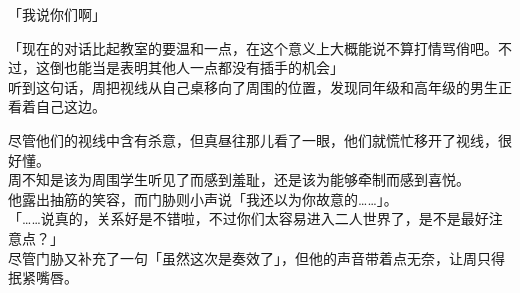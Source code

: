 「我说你们啊」

「现在的对话比起教室的要温和一点，在这个意义上大概能说不算打情骂俏吧。不过，这倒也能当是表明其他人一点都没有插手的机会」\\

听到这句话，周把视线从自己桌移向了周围的位置，发现同年级和高年级的男生正看着自己这边。

尽管他们的视线中含有杀意，但真昼往那儿看了一眼，他们就慌忙移开了视线，很好懂。\\

周不知是该为周围学生听见了而感到羞耻，还是该为能够牵制而感到喜悦。\\

他露出抽筋的笑容，而门胁则小声说「我还以为你故意的……」。\\

「……说真的，关系好是不错啦，不过你们太容易进入二人世界了，是不是最好注意点？」\\

尽管门胁又补充了一句「虽然这次是奏效了」，但他的声音带着点无奈，让周只得抿紧嘴唇。
